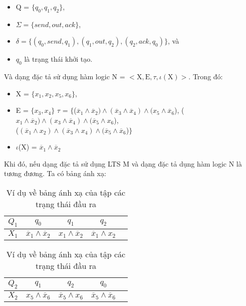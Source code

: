 \documentclass[a4paper,13pt,oneside,openany]{book}
\begin{document}
\begin{flushleft}
		\begin{itemize}
			\item Q = $\{q_0, q_1, q_2\}$,
			\item $\Sigma = \{send, out, ack\}$,
			\item $\delta = \{(q_0, send, q_1), (q_1, out, q_2), (q_2, ack, q_0)\}$, và
			\item $q_0$ là trạng thái khởi tạo.
		\end{itemize}
		Và dạng đặc tả sử dụng hàm logic N = $<\textrm{X}, \textrm{E}, \tau, \iota(\textrm{X})>$. Trong đó:\\
		\begin{itemize}
			\item X = $\{x_1, x_2, x_5, x_6\}$,
			\item E = $\{x_3, x_4\}$
			$\tau$ = $\{$($\overline{x}_1 \land \overline{x}_2) \land (\overline{x}_3 \land \overline{x}_4) \land (x_5 \land \overline{x}_6$), ($x_1\land\overline{x}_2)\land (x_3\land \overline{x}_4)\land (\overline{x}_5 \land x_6$),\\
			($(\overline{x}_1\land x_2)\land(\overline{x}_3\land x_4)\land (\overline{x}_5\land\overline{x}_6$)$\}$
			\item $\iota$(X) = $\overline{x}_1 \land \overline{x}_2$
		\end{itemize}
		Khi đó, nếu dạng đặc tả sử dụng LTS M và dạng đặc tả dụng hàm logic N là tương đương. Ta có bảng ánh xạ:
		\begin{table}[!ht]
			\centering
			\renewcommand{\arraystretch}{1.25}
			\begin{tabular}{|c|c|c|c|c|}
				\hline
				$Q_1$ & $q_0$ & $q_1$ & $q_2$\\
				\hline
				$X_1$ & $\overline{x}_1 \land \overline{x}_2$ & $x_1\land\overline{x}_2$&$\overline{x}_1\land x_2$\\
				\hline
			\end{tabular}
			\caption{Ví dụ về bảng ánh xạ của tập trạng thái đầu vào}
			\begin{tabular}{|c|c|c|c|c|}
				\hline
				$Q_2$ & $q_1$ & $q_2$ & $q_0$\\
				\hline
				$X_2$ & $x_5 \land \overline{x}_6$ & $\overline{x}_5 \land x_6$& $\overline{x}_5\land\overline{x}_6$\\
				\hline
			\end{tabular}
			\caption{Ví dụ về bảng ánh xạ của tập các trạng thái đầu ra}
		\end{table}
		\begin{table}[!ht]
			\centering
			\renewcommand{\arraystretch}{1.25}

\end{table}
\end{flushleft}
\end{document}
